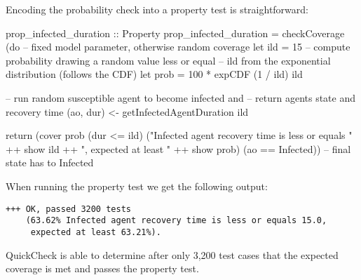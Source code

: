 Encoding the probability check into a property test is straightforward:

\begin{HaskellCode}
prop_infected_duration :: Property
prop_infected_duration = checkCoverage (do
  -- fixed model parameter, otherwise random coverage
  let ild  = 15
  -- compute probability drawing a random value less or equal
  -- ild from the exponential distribution (follows the CDF)
  let prob = 100 * expCDF (1 / ild) ild

  -- run random susceptible agent to become infected and
  -- return agents state and recovery time
  (ao, dur) <- getInfectedAgentDuration ild

  return (cover prob (dur <= ild) 
            ("Infected agent recovery time is less or equals " ++ show ild ++ 
             ", expected at least " ++ show prob) 
            (ao == Infected)) -- final state has to Infected
\end{HaskellCode}

When running the property test we get the following output:

\begin{footnotesize}
\begin{verbatim}
+++ OK, passed 3200 tests 
    (63.62% Infected agent recovery time is less or equals 15.0, 
     expected at least 63.21%).
\end{verbatim}
\end{footnotesize}

QuickCheck is able to determine after only 3,200 test cases that the expected coverage is met and passes the property test.